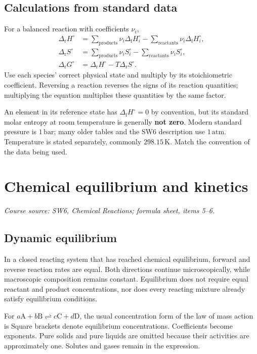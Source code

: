 \documentclass[a4paper,10pt]{article}
\newcommand{\source}[1]{{\small\textit{Course source: #1.}\par}}
\newcommand{\chemunit}[1]{\,\mathrm{#1}}
\newcommand{\chapterbreak}{\clearpage}
\begin{document}
\subsection{Calculations from standard data}
For a balanced reaction with coefficients $\nu_i$,
\begin{align*}
 \Delta_{\mathrm r}H^\circ
 &=\sum_{\mathrm{products}}\nu_i\Delta_{\mathrm f}H_i^\circ
   -\sum_{\mathrm{reactants}}\nu_i\Delta_{\mathrm f}H_i^\circ,\\
 \Delta_{\mathrm r}S^\circ
 &=\sum_{\mathrm{products}}\nu_i S_i^\circ
   -\sum_{\mathrm{reactants}}\nu_i S_i^\circ,\\
 \Delta_{\mathrm r}G^\circ
 &=\Delta_{\mathrm r}H^\circ-T\Delta_{\mathrm r}S^\circ.
\end{align*}
Use each species' correct physical state and multiply by its stoichiometric
coefficient. Reversing a reaction reverses the signs of its reaction quantities;
multiplying the equation multiplies these quantities by the same factor.

An element in its reference state has $\Delta_{\mathrm f}H^\circ=0$ by convention,
but its standard molar entropy at room temperature is generally \textbf{not zero}.
Modern standard pressure is $1\chemunit{bar}$; many older tables and the SW6
description use $1\chemunit{atm}$. Temperature is stated separately, commonly
$298.15\chemunit K$. Match the convention of the data being used.

\chapterbreak
\section{Chemical equilibrium and kinetics}
\label{sec:equilibrium}
\source{SW6, Chemical Reactions; formula sheet, items 5--6}

\subsection{Dynamic equilibrium}
In a closed reacting system that has reached chemical equilibrium, forward and
reverse reaction rates are equal. Both directions continue microscopically,
while macroscopic composition remains constant. Equilibrium does not require
equal reactant and product concentrations, nor does every reacting mixture
already satisfy equilibrium conditions.

For $a\mathrm A+b\mathrm B\rightleftharpoons c\mathrm C+d\mathrm D$,
the usual concentration form of the law of mass action is
Square brackets denote equilibrium concentrations. Coefficients become
exponents. Pure solids and pure liquids are omitted because their activities
are approximately one. Solutes and gases remain in the expression.
\end{document}
